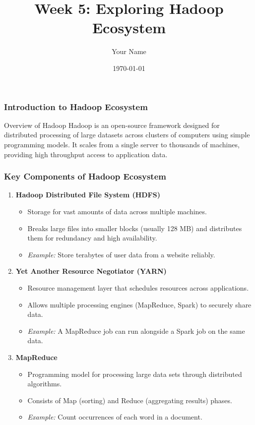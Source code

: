 \documentclass[aspectratio=169]{beamer}
\title[Week 5: Exploring Hadoop Ecosystem]{Week 5: Exploring Hadoop Ecosystem}
\author[J. Smith]{Your Name}
\institute[University Name]{
  Department of Computer Science\\
  University Name\\
  \vspace{0.3cm}
  Email: email@university.edu\\
  Website: www.university.edu
}
\date{\today}
\begin{document}
\frame{\titlepage}

\begin{frame}[fragile]
    \frametitle{Introduction to Hadoop Ecosystem}
    \begin{block}{Overview of Hadoop}
        Hadoop is an open-source framework designed for distributed processing of large datasets across clusters of computers using simple programming models. 
        It scales from a single server to thousands of machines, providing high throughput access to application data.
    \end{block}
\end{frame}

\begin{frame}[fragile]
    \frametitle{Key Components of Hadoop Ecosystem}
    \begin{enumerate}
        \item \textbf{Hadoop Distributed File System (HDFS)}
        \begin{itemize}
            \item Storage for vast amounts of data across multiple machines.
            \item Breaks large files into smaller blocks (usually 128 MB) and distributes them for redundancy and high availability.
            \item \textit{Example:} Store terabytes of user data from a website reliably.
        \end{itemize}
        
        \item \textbf{Yet Another Resource Negotiator (YARN)}
        \begin{itemize}
            \item Resource management layer that schedules resources across applications.
            \item Allows multiple processing engines (MapReduce, Spark) to securely share data.
            \item \textit{Example:} A MapReduce job can run alongside a Spark job on the same data.
        \end{itemize}
        
        \item \textbf{MapReduce}
        \begin{itemize}
            \item Programming model for processing large data sets through distributed algorithms.
            \item Consists of Map (sorting) and Reduce (aggregating results) phases.
            \item \textit{Example:} Count occurrences of each word in a document.
        \end{itemize}
    \end{enumerate}
\end{frame}
\end{document}
